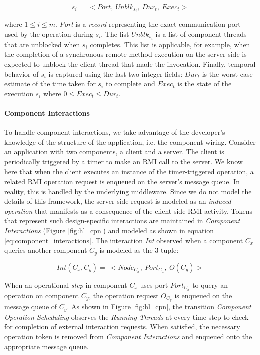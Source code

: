 \vspace{-0.1in}
\begin{equation}
s_i = \ <Port, \ Unblk_{s_i}, \ Dur_t, \ Exec_t>
\end{equation}

where $1 \le i \le m$. \emph{Port} is a \emph{record} representing the exact communication port used by the operation during $s_i$. The list $Unblk_{s_i}$ is a list of component threads that are unblocked when $s_i$ completes. This list is applicable, for example, when the completion of a synchronous remote method execution on the server side is expected to unblock the client thread that made the invocation. Finally, temporal behavior of $s_i$ is captured using the last two integer fields: \emph{$Dur_t$} is the worst-case estimate of the time taken for $s_i$ to complete and $Exec_t$ is the state of the execution $s_i$ where $0 \le Exec_t \le Dur_t$.

\paragraph{Component Interactions}

To handle component interactions, we take advantage of the developer's knowledge of the structure of the application, i.e. the component wiring. Consider an application with two components, a client and a server. The client is periodically triggered by a timer to make an RMI call to the server. We know here that when the client executes an instance of the timer-triggered operation, a related RMI operation request is enqueued on the server's message queue. In reality, this is handled by the underlying middleware. Since we do not model the details of this framework, the server-side request is modeled as an \emph{induced operation} that manifests as a consequence of the client-side RMI activity. Tokens that represent such design-specific interactions are maintained in \emph{Component Interactions} (Figure \ref{fig:hl_cpn}) and modeled as shown in equation \ref{eq:component_interactions}. The interaction \emph{Int} observed when a component $C_x$ queries another component $C_y$ is modeled as the 3-tuple:

\vspace{-0.1in}
\begin{equation}
\label{eq:component_interactions}
Int(C_x, C_y) = \ < Node_{C_x}, \ Port_{C_x}, \ O(C_y)>
\end{equation}

When an operational \emph{step} in component $C_x$ uses port $Port_{C_x}$ to query an operation on component $C_y$, the operation request $O_{C_y}$ is enqueued on the message queue of $C_y$. As shown in Figure \ref{fig:hl_cpn}, the transition \emph{Component Operation Scheduling} observes the \emph{Running Threads} at every time step to check for completion of external interaction requests. When satisfied, the necessary operation token is removed from \emph{Component Interactions} and enqueued onto the appropriate message queue.

